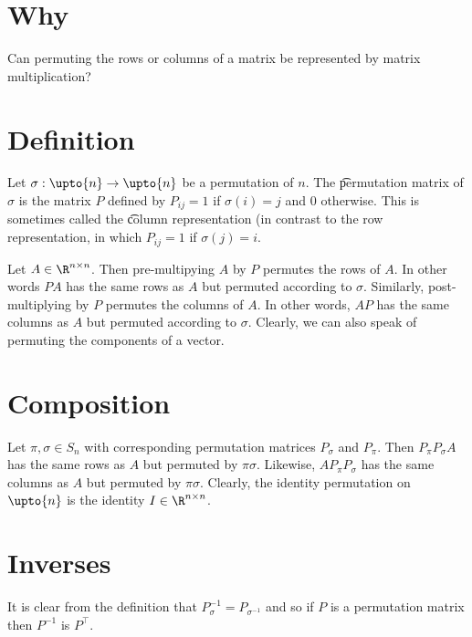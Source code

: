 

\section*{Why}

Can permuting the rows or columns of a matrix be represented by matrix multiplication?

\section*{Definition}

Let $\sigma  : \upto{n} \to \upto{n}$ be a permutation of $n$.
The \t{permutation matrix} of $\sigma  $ is the matrix $P$ defined by $P_{ij} = 1$ if $\sigma  (i) = j$ and 0 otherwise.
This is sometimes called the \t{column representation} (in contrast to the row representation, in which $P_{ij} = 1$ if $\sigma  (j) = i$.

Let $A \in \R  ^{n \times  n}$.
Then pre-multipying $A$ by $P$ permutes the rows of $A$.
In other words $PA$ has the same rows as $A$ but permuted according to $\sigma  $.
Similarly, post-multiplying by $P$ permutes the columns of $A$.
In other words, $AP$ has the same columns as $A$ but permuted according to $\sigma  $.
Clearly, we can also speak of permuting the components of a vector.

\section*{Composition}

Let $\pi  , \sigma  \in S_n$ with corresponding permutation matrices $P_\sigma  $ and $P_\pi  $.
Then $P_{\pi  }P_{\sigma  }A$ has the same rows as $A$ but permuted by $\pi  \sigma  $.
Likewise, $AP_{\pi  }P_{\sigma  }$ has the same columns as $A$ but permuted by $\pi  \sigma  $.
Clearly, the identity permutation on $\upto{n}$ is the identity $I \in \R  ^{n \times  n}$.

\section*{Inverses}

It is clear from the definition that $P_{\sigma  }^{-1} = P_{\sigma  ^{-1}}$ and so if $P$ is a permutation matrix then $P^{-1}$ is $P^\top $.

\blankpage
